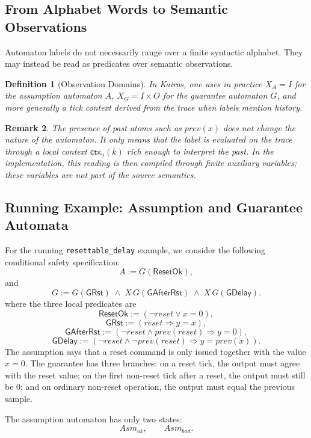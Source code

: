 \documentclass[11pt,a4paper]{article}
\newtheorem{definition}{Definition}[section]
\newtheorem{remark}[definition]{Remark}
\newcommand{\ctx}{\mathsf{ctx}}
\newcommand{\ResetOk}{\mathsf{ResetOk}}
\newcommand{\GuardReset}{\mathsf{GRst}}
\newcommand{\GuardAfterReset}{\mathsf{GAfterRst}}
\newcommand{\GuardDelay}{\mathsf{GDelay}}
\begin{document}
\subsection{From Alphabet Words to Semantic Observations}

Automaton labels do not necessarily range over a finite syntactic alphabet.
They may instead be read as predicates over semantic observations.

\begin{definition}[Observation Domains]
In Kairos, one uses in practice \(X_A = I\) for the assumption automaton
\(A\), \(X_G = I \times O\) for the guarantee automaton \(G\), and more
generally a tick context derived from the trace when labels mention history.
\end{definition}

\begin{remark}
The presence of past atoms such as \(prev(x)\) does not change the nature of
the automaton. It only means that the label is evaluated on the trace through a
local context \(\ctx_u(k)\) rich enough to interpret the past. In the
implementation, this reading is then compiled through finite auxiliary
variables; these variables are not part of the source semantics.
\end{remark}

\subsection{Running Example: Assumption and Guarantee Automata}

For the running \texttt{resettable\_delay} example, we consider the following
conditional safety specification:
\[
A := G(\ResetOk),
\]
and
\[
G :=
G(\GuardReset)
\;\land\;
X\,G(\GuardAfterReset)
\;\land\;
X\,G(\GuardDelay).
\]
where the three local predicates are
\[
\ResetOk := (\neg reset \vee x = 0),
\]
\[
\GuardReset := (reset \Rightarrow y = x),
\]
\[
\GuardAfterReset := (\neg reset \land prev(reset) \Rightarrow y = 0),
\]
\[
\GuardDelay := (\neg reset \land \neg prev(reset) \Rightarrow y = prev(x)).
\]
The assumption says that a reset command is only issued together with the value
\(x=0\). The guarantee has three branches: on a reset tick, the output must
agree with the reset value; on the first non-reset tick after a reset, the
output must still be \(0\); and on ordinary non-reset operation, the output
must equal the previous sample.

The assumption automaton has only two states:
\[
Asm_{ok},\qquad Asm_{bad}.
\]
\end{document}
